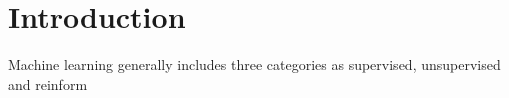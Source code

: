 \section{Introduction}

Machine learning generally includes three categories as supervised, unsupervised and reinform
